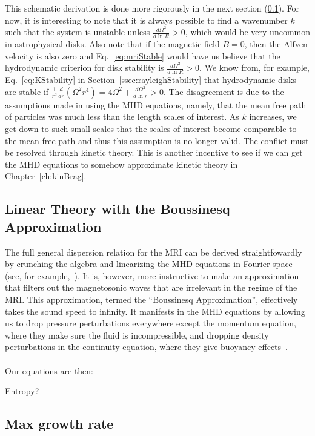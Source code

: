 This schematic derivation is done more rigorously in the next section (\ref{ssec:mriLinear}). For now, it is interesting to note that it is always possible to find a wavenumber $k$ such that the system is unstable unless $\frac{d\Omega^2}{d\ln R}>0$, which would be very uncommon in astrophysical disks. Also note that if the magnetic field $B=0$, then the Alfven velocity is also zero and Eq.~\ref{eq:mriStable} would have us believe that the hydrodynamic criterion for disk stability is $\frac{d\Omega^2}{d\ln R}>0$. We know from, for example, Eq.~\ref{eq:KStability} in Section~\ref{ssec:rayleighStability} that hydrodynamic disks are stable if $\frac1{r^2}\frac{d}{dr}(\Omega^2r^4)=4\Omega^2+\frac{d\Omega^2}{d\ln r}>0$. The disagreement is due to the assumptions made in using the MHD equations, namely, that the mean free path of particles was much less than the length scales of interest. As $k$ increases, we get down to such small scales that the scales of interest become comparable to the mean free path and thus this assumption is no longer valid. The conflict must be resolved through kinetic theory. This is another incentive to see if we can get the MHD equations to somehow approximate kinetic theory in Chapter~\ref{ch:kinBrag}.

\subsection{Linear Theory with the Boussinesq Approximation}\label{ssec:mriLinear}
The full general dispersion relation for the MRI can be derived straightfowardly by crunching the algebra and linearizing the MHD equations in Fourier space (see, for example,~\cite{BH1991a}). It is, however, more instructive to make an approximation that filters out the magnetosonic waves that are irrelevant in the regime of the MRI. This approximation, termed the ``Boussinesq Approximation'', effectively takes the sound speed to infinity. It manifests in the MHD equations by allowing us to drop pressure perturbations everywhere except the momentum equation, where they make sure the fluid is incompressible, and dropping density perturbations in the continuity equation, where they give buoyancy effects~\cite{KunzBoussNotes}.\\
\\
Our equations are then:

Entropy? 

\subsection{Max growth rate}

